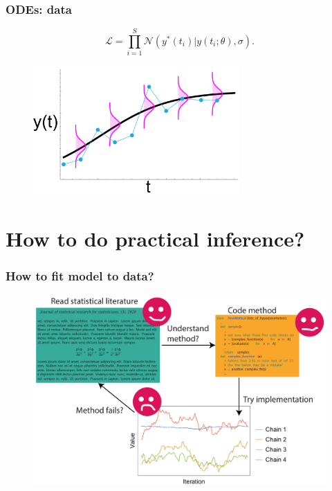 \documentclass[handout]{beamer}
\begin{document}
\begin{frame}
	\frametitle{ODEs: data}
	
	\begin{equation}
	\mathcal{L} = \prod_{i=1}^{S} \mathcal{N}(y^*(t_i)| y(t_i;\theta), \sigma).
	\end{equation}
	
	\begin{figure}
		\centerline{\includegraphics[width=0.7\textwidth]{./Figures/lec7_odeSingleBulding2_data.pdf}}
	\end{figure}
	
\end{frame}

\section{How to do practical inference?}

\frame{\tableofcontents[currentsection]}

\begin{frame}
	\frametitle{How to fit model to data?}
	
	\begin{figure}
		\centerline{\includegraphics[width=1\textwidth]{./Figures/student_cycle.pdf}}
	\end{figure}
	
\end{frame}
\end{document}
